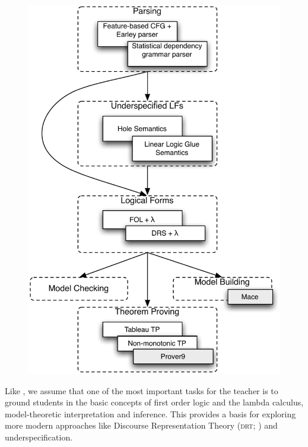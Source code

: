 \documentclass[11pt,a4paper]{article}
\newcommand{\DRT}{\textsc{drt}}
\begin{document}
\begin{figure}
  \centering
\includegraphics[scale=.6]{modules}  
\end{figure}

Like \citet{BB}, we assume that one of the most important tasks for
the teacher is to ground students in the basic concepts of first order
logic and the lambda calculus, model-theoretic interpretation and
inference. This provides a basis for exploring more modern approaches
like Discourse Representation Theory (\DRT; \citet{KampReyle}) and
underspecification.
\end{document}
